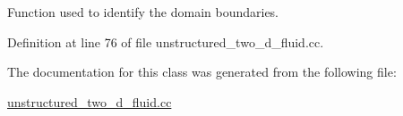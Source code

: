 Function used to identify the domain boundaries. 



Definition at line 76 of file unstructured\+\_\+two\+\_\+d\+\_\+fluid.\+cc.



The documentation for this class was generated from the following file\+:\begin{DoxyCompactItemize}
\item 
\hyperlink{unstructured__two__d__fluid_8cc}{unstructured\+\_\+two\+\_\+d\+\_\+fluid.\+cc}\end{DoxyCompactItemize}
